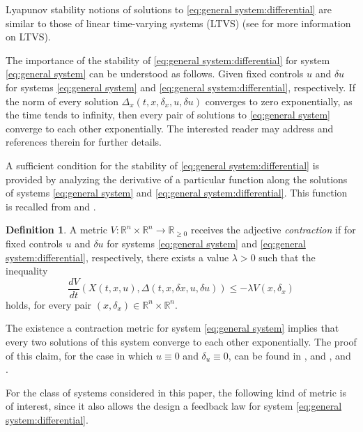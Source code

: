 \documentclass[10pt,twocolumn,twoside]{IEEEtran}
\theoremstyle{plain}
\theoremstyle{definition}
\newtheorem{definition}{Definition}
\theoremstyle{remark}
\begin{document}
Lyapunov stability notions of solutions to \eqref{eq:general system:differential} are similar to those of linear time-varying systems (LTVS) (see \cite{Hespanha:2009} for more information on LTVS). 

The importance of the stability of \eqref{eq:general system:differential} for system \eqref{eq:general system} can be understood as follows. Given fixed controls $u$ and $\delta u$ for systems \eqref{eq:general system} and \eqref{eq:general system:differential}, respectively. If the norm of every solution $\Delta_x(t,x,\delta_x,u,\delta u)$ converges to zero exponentially, as the time tends to infinity, then every pair of solutions to \eqref{eq:general system} converge to each other exponentially. The interested reader may address \cite{Lohmiller1998,Sontag2010} and references therein for further details.

A sufficient condition for the stability of \eqref{eq:general system:differential} is provided by analyzing the derivative of a particular function along the solutions of systems \eqref{eq:general system} and \eqref{eq:general system:differential}. This function is recalled from \cite{Forni2014} and \cite{Manchester2014a}.

\begin{definition}\label{def:}
		 A metric $V:\mathbb{R}^n\times\mathbb{R}^n\to\mathbb{R}_{\geq0}$ receives the adjective \emph{contraction} if for fixed controls $u$ and $\delta u$ for systems \eqref{eq:general system} and \eqref{eq:general system:differential}, respectively, there exists a value $\lambda>0$ such that the inequality
	 	 \begin{equation}
	 	 	\frac{dV}{dt}(X(t,x,u),\Delta(t,x,\delta x,u,\delta u))\leq -\lambda V(x,\delta_x)
 	 	 \end{equation}
 	 	 holds, for every pair $(x,\delta_x)\in\mathbb{R}^n\times\mathbb{R}^n$.
\end{definition}


The existence a contraction metric for system \eqref{eq:general system} implies that every two solutions of this system converge to each other exponentially. The proof of this claim, for the case in which $u\equiv0$ and $\delta_u\equiv0$, can be found in \cite[Theorem 1]{Lewis1951}, and \cite[Theorems 5.7 and 5.33]{Reich2005}, and \cite[Lemma 3.3]{Isac2008}.

For the class of systems considered in this paper, the following kind of metric is of interest, since it also allows the design a feedback law for system \eqref{eq:general system:differential}.
\end{document}

